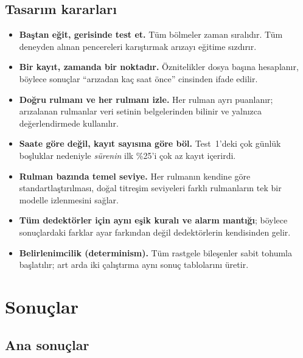 \documentclass[11pt]{article}
\begin{document}
\subsection{Tasarım kararları}
\label{sec:design}
\begin{itemize}
  \item \textbf{Baştan eğit, gerisinde test et.} Tüm bölmeler zaman sıralıdır. Tüm deneyden alınan
        pencereleri karıştırmak arızayı eğitime sızdırır.
  \item \textbf{Bir kayıt, zamanda bir noktadır.} Öznitelikler dosya başına hesaplanır, böylece
        sonuçlar ``arızadan kaç saat önce'' cinsinden ifade edilir.
  \item \textbf{Doğru rulmanı ve her rulmanı izle.} Her rulman ayrı puanlanır; arızalanan rulmanlar
        veri setinin belgelerinden bilinir ve yalnızca değerlendirmede kullanılır.
  \item \textbf{Saate göre değil, kayıt sayısına göre böl.} Test~1'deki çok günlük boşluklar
        nedeniyle \emph{sürenin} ilk \%25'i çok az kayıt içerirdi.
  \item \textbf{Rulman bazında temel seviye.} Her rulmanın kendine göre standartlaştırılması, doğal
        titreşim seviyeleri farklı rulmanların tek bir modelle izlenmesini sağlar.
  \item \textbf{Tüm dedektörler için aynı eşik kuralı ve alarm mantığı}; böylece sonuçlardaki farklar
        ayar farkından değil dedektörlerin kendisinden gelir.
  \item \textbf{Belirlenimcilik (determinism).} Tüm rastgele bileşenler sabit tohumla başlatılır; art
        arda iki çalıştırma aynı sonuç tablolarını üretir.
\end{itemize}

\section{Sonuçlar}
\label{sec:results}

\subsection{Ana sonuçlar}
\end{document}
